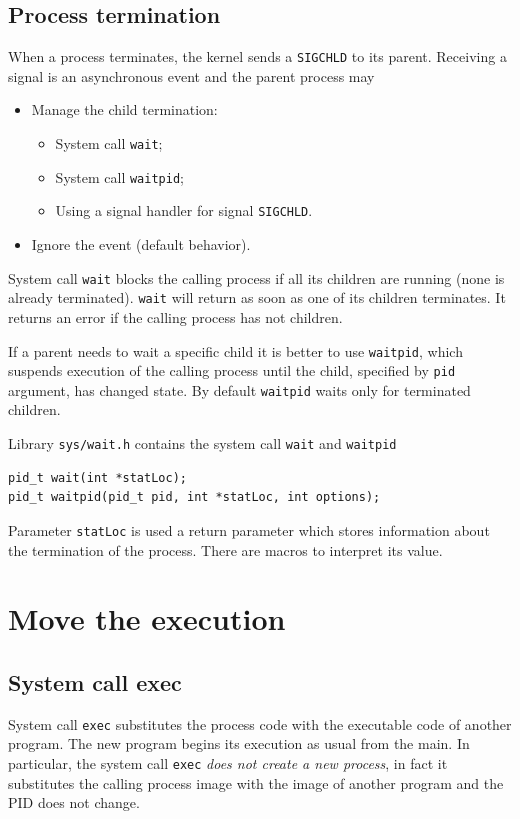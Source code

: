 \subsection{Process termination}
When a process terminates, the kernel sends a \texttt{SIGCHLD} to its parent. Receiving a signal is an asynchronous event and the parent process may
\begin{itemize}
\item Manage the child termination:
\begin{itemize}
\item System call \texttt{wait};
\item System call \texttt{waitpid};
\item Using a signal handler for signal \texttt{SIGCHLD}.
\end{itemize}
\item Ignore the event (default behavior).
\end{itemize}

System call \texttt{wait} blocks the calling process if all its children are running (none is already terminated). \texttt{wait} will return as soon as one of its children terminates. It returns an error if the calling process has not children.

If a parent needs to wait a specific child it is better to use \texttt{waitpid}, which suspends execution of the calling process until the child, specified by \texttt{pid} argument, has changed state. By default \texttt{waitpid} waits only for terminated children.

Library \texttt{sys/wait.h} contains the system call \texttt{wait} and \texttt{waitpid}
\begin{verbatim}
pid_t wait(int *statLoc);
pid_t waitpid(pid_t pid, int *statLoc, int options);
\end{verbatim}

Parameter \texttt{statLoc} is used a return parameter which stores information about the termination of the process. There are macros to interpret its value.

\section{Move the execution}
\subsection{System call exec}
System call \texttt{exec} substitutes the process code with the executable code of another program. The new program begins its execution as usual from the main. In particular, the system call \texttt{exec} \textit{does not create a new process}, in fact it substitutes the calling process image with the image of another program and the PID does not change.

